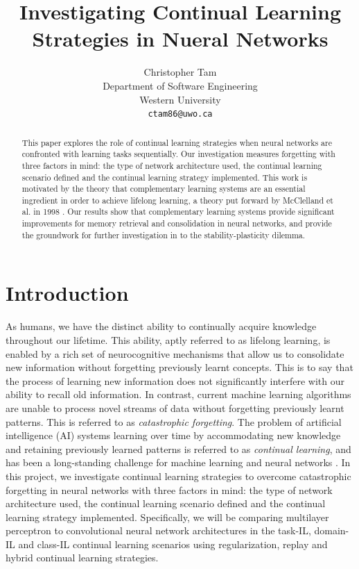 \documentclass{article}
\title{Investigating Continual Learning Strategies in Nueral Networks}
\author{
  Christopher Tam \\
  Department of Software Engineering\\
  Western University\\
  \texttt{ctam86@uwo.ca} \\
}
\begin{document}
\maketitle

\begin{abstract}
    This paper explores the role of continual learning strategies when neural networks are confronted with learning tasks sequentially. Our investigation measures forgetting with three factors in mind: the type of network architecture used, the continual learning scenario defined and the continual learning strategy implemented. This work is motivated by the theory that complementary learning systems are an essential ingredient in order to achieve lifelong learning, a theory put forward by McClelland et al. in 1998 \cite{mcclelland1995there}. Our results show that complementary learning systems provide significant improvements for memory retrieval and consolidation in neural networks, and provide the groundwork for further investigation in to the stability-plasticity dilemma. 
\end{abstract}

\section{Introduction}
As humans, we have the distinct ability to continually acquire knowledge throughout our lifetime. This ability, aptly referred to as lifelong learning, is enabled by a rich set of neurocognitive mechanisms that allow us to consolidate new information without forgetting previously learnt concepts. This is to say that the process of learning new information does not significantly interfere with our ability to recall old information. In contrast, current machine learning algorithms are unable to process novel streams of data without forgetting previously learnt patterns. This is referred to as \textit{catastrophic forgetting}. The problem of artificial intelligence (AI) systems learning over time by accommodating new knowledge and retaining previously learned patterns is referred to as \textit{continual learning}, and has been a long-standing challenge for machine learning and neural networks \cite{hassabis2017neuroscience}. In this project, we investigate continual learning strategies to overcome catastrophic forgetting in neural networks with three factors in mind: the type of network architecture used, the continual learning scenario defined and the continual learning strategy implemented. Specifically, we will be comparing multilayer perceptron to convolutional neural network architectures in the task-IL, domain-IL and class-IL continual learning scenarios using regularization, replay and hybrid continual learning strategies. 
\end{document}
